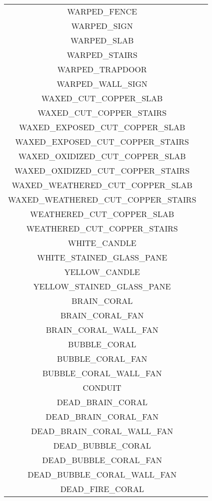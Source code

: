 \begin{longtable}{ |c|c| }
	WARPED\_FENCE & \xmark \\
	WARPED\_SIGN & \xmark \\
	WARPED\_SLAB & \xmark \\
	WARPED\_STAIRS & \xmark \\
	WARPED\_TRAPDOOR & \xmark \\
	WARPED\_WALL\_SIGN & \xmark \\
	WAXED\_CUT\_COPPER\_SLAB & \xmark \\
	WAXED\_CUT\_COPPER\_STAIRS & \xmark \\
	WAXED\_EXPOSED\_CUT\_COPPER\_SLAB & \xmark \\
	WAXED\_EXPOSED\_CUT\_COPPER\_STAIRS & \xmark \\
	WAXED\_OXIDIZED\_CUT\_COPPER\_SLAB & \xmark \\
	WAXED\_OXIDIZED\_CUT\_COPPER\_STAIRS & \xmark \\
	WAXED\_WEATHERED\_CUT\_COPPER\_SLAB & \xmark \\
	WAXED\_WEATHERED\_CUT\_COPPER\_STAIRS & \xmark \\
	WEATHERED\_CUT\_COPPER\_SLAB & \xmark \\
	WEATHERED\_CUT\_COPPER\_STAIRS & \xmark \\
	WHITE\_CANDLE & \xmark \\
	WHITE\_STAINED\_GLASS\_PANE & \xmark \\
	YELLOW\_CANDLE & \xmark \\
	YELLOW\_STAINED\_GLASS\_PANE & \xmark \\
	\hline
	BRAIN\_CORAL & \cmark \\
	BRAIN\_CORAL\_FAN & \cmark \\
	BRAIN\_CORAL\_WALL\_FAN & \cmark \\
	BUBBLE\_CORAL & \cmark \\
	BUBBLE\_CORAL\_FAN & \cmark \\
	BUBBLE\_CORAL\_WALL\_FAN & \cmark \\
	CONDUIT & \cmark \\
	DEAD\_BRAIN\_CORAL & \cmark \\
	DEAD\_BRAIN\_CORAL\_FAN & \cmark \\
	DEAD\_BRAIN\_CORAL\_WALL\_FAN & \cmark \\
	DEAD\_BUBBLE\_CORAL & \cmark \\
	DEAD\_BUBBLE\_CORAL\_FAN & \cmark \\
	DEAD\_BUBBLE\_CORAL\_WALL\_FAN & \cmark \\
	DEAD\_FIRE\_CORAL & \cmark \\

\end{longtable}
